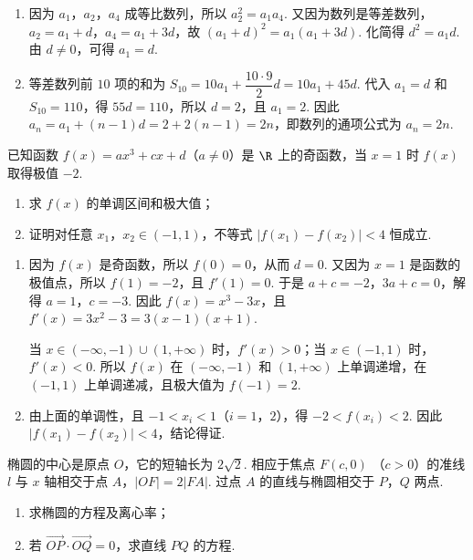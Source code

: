\begin{solution}
\begin{enumerate}
\item 因为 \(a_1\)，\(a_2\)，\(a_4\) 成等比数列，所以 \(a_2^2=a_1a_4\). 又因为数列是等差数列，\(a_2=a_1+d\)，\(a_4=a_1+3d\)，故
\((a_1+d)^2=a_1(a_1+3d)\). 化简得 \(d^2=a_1d\). 由 \(d\ne0\)，可得 \(a_1=d\).
\item 等差数列前 \(10\) 项的和为
\(S_{10}=10a_1+\dfrac{10\cdot9}{2}d=10a_1+45d\). 代入 \(a_1=d\) 和 \(S_{10}=110\)，得 \(55d=110\)，所以 \(d=2\)，且 \(a_1=2\). 因此
\(a_n=a_1+(n-1)d=2+2(n-1)=2n\)，即数列的通项公式为 \(a_n=2n\).
\end{enumerate}
\end{solution}

\begin{problem}
已知函数 \( f(x) = ax^3 + cx + d \)（\(a \neq 0\)）是 \(\R\) 上的奇函数，当 \(x = 1\) 时 \(f(x)\) 取得极值 \(-2\).

\begin{enumerate}
\item 求 \( f(x) \) 的单调区间和极大值；
\item 证明对任意 \(x_{1}\)，\(x_{2} \in (-1, 1)\)，不等式 \(|f(x_{1}) - f(x_{2})| < 4\) 恒成立.
\end{enumerate}
\end{problem}

\begin{solution}
\begin{enumerate}
\item 因为 \(f(x)\) 是奇函数，所以 \(f(0)=0\)，从而 \(d=0\). 又因为 \(x=1\) 是函数的极值点，所以 \(f(1)=-2\)，且 \(f'(1)=0\). 于是
\(a+c=-2\)，\(3a+c=0\)，解得 \(a=1\)，\(c=-3\). 因此 \(f(x)=x^3-3x\)，且
\(f'(x)=3x^2-3=3(x-1)(x+1)\).

当 \(x\in(-\infty,-1)\cup(1,+\infty)\) 时，\(f'(x)>0\)；当 \(x\in(-1,1)\) 时，\(f'(x)<0\). 所以 \(f(x)\) 在 \((-\infty,-1)\) 和 \((1,+\infty)\) 上单调递增，在 \((-1,1)\) 上单调递减，且极大值为 \(f(-1)=2\).
\item 由上面的单调性，且 \(-1<x_i<1\)（\(i=1\)，\(2\)），得 \(-2<f(x_i)<2\). 因此
\(|f(x_1)-f(x_2)|<4\)，结论得证.
\end{enumerate}
\end{solution}

\begin{problem}
椭圆的中心是原点 \(O\)，它的短轴长为 \(2\sqrt{2}\). 相应于焦点 \(F(c,0)\) （\(c > 0\)）的准线 \(l\) 与 \(x\) 轴相交于点 \(A\)，\(|OF| = 2|FA|\). 过点 \(A\) 的直线与椭圆相交于 \(P\)，\(Q\) 两点.

\begin{enumerate}
\item 求椭圆的方程及离心率；
\item 若 \(\overrightarrow{OP} \cdot \overrightarrow{OQ} = 0\)，求直线 \(PQ\) 的方程.
\end{enumerate}
\end{problem}

